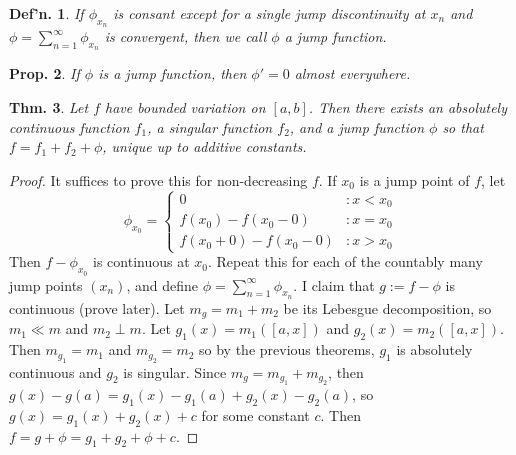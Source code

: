 \documentclass[12pt, a4paper]{book}
\newtheorem{theorem}{Thm.}[section]
\newtheorem{definition}[theorem]{Def'n.}
\newtheorem{proposition}[theorem]{Prop.}
\theoremstyle{nonumberplain}
\newtheorem{proof}{Proof}
\begin{document}
\begin{definition}
    If $\phi_{x_n}$ is consant except for a single jump discontinuity at $x_n$ and $\phi=\sum_{n=1}^\infty \phi_{x_n}$ is convergent, then we call $\phi$ a jump function.
\end{definition}
\begin{proposition}
    If $\phi$ is a jump function, then $\phi'=0$ almost everywhere.
\end{proposition}
\begin{theorem}
    Let $f$ have bounded variation on $[a,b]$.
    Then there exists an absolutely continuous function $f_1$, a singular function $f_2$, and a jump function $\phi$ so that $f=f_1+f_2+\phi$, unique up to additive constants.
\end{theorem}
\begin{proof}
    It suffices to prove this for non-decreasing $f$.
    If $x_0$ is a jump point of $f$, let
    \[\phi_{x_0}=
        \begin{cases}
            0 &: x<x_0\\
            f(x_0)-f(x_0-0) &: x=x_0\\
            f(x_0+0)-f(x_0-0) &: x>x_0
        \end{cases}
    \]
    Then $f-\phi_{x_0}$ is continuous at $x_0$.
    Repeat this for each of the countably many jump points $(x_n)$, and define $\phi=\sum_{n=1}^\infty \phi_{x_n}$.
    I claim that $g:=f-\phi$ is continuous (prove later).
    Let $m_g=m_1+m_2$ be its Lebesgue decomposition, so $m_1\ll m$ and $m_2\perp m$.
    Let $g_1(x)=m_1([a,x])$ and $g_2(x)=m_2([a,x])$.
    Then $m_{g_1}=m_1$ and $m_{g_2}=m_2$ so by the previous theorems, $g_1$ is absolutely continuous and $g_2$ is singular.
    Since $m_g=m_{g_1}+m_{g_2}$, then $g(x)-g(a)=g_1(x)-g_1(a)+g_2(x)-g_2(a)$, so $g(x)=g_1(x)+g_2(x)+c$ for some constant $c$.
    Then $f=g+\phi=g_1+g_2+\phi+c$.
\end{proof}
\end{document}

